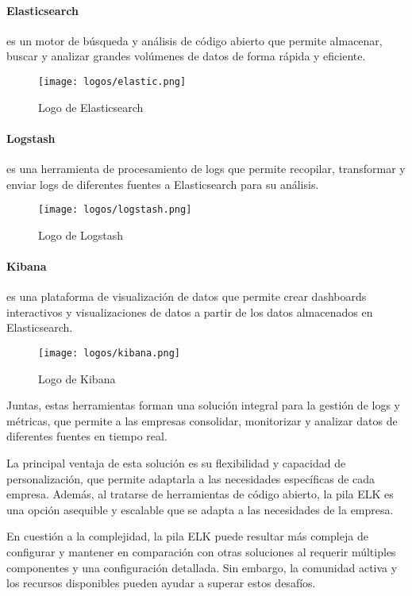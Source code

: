 \paragraph{Elasticsearch} es un motor de búsqueda y análisis de código abierto
que permite almacenar, buscar y analizar grandes volúmenes de datos de forma
rápida y eficiente.

\begin{figure}[H]
	\centering
	\texttt{[image: logos/elastic.png]}
	\caption{Logo de Elasticsearch~\textregistered}
\end{figure}

\paragraph{Logstash} es una herramienta de procesamiento de logs que permite
recopilar, transformar y enviar logs de diferentes fuentes a Elasticsearch para
su análisis.

\begin{figure}[H]
	\centering
	\texttt{[image: logos/logstash.png]}
	\caption{Logo de Logstash~\textregistered}
\end{figure}

\paragraph{Kibana} es una plataforma de visualización de datos que permite
crear dashboards interactivos y visualizaciones de datos a partir de los datos
almacenados en Elasticsearch.

\begin{figure}[H]
	\centering
	\texttt{[image: logos/kibana.png]}
	\caption{Logo de Kibana~\textregistered}
\end{figure}

Juntas, estas herramientas forman una solución integral para la
gestión de logs y métricas, que permite a las empresas consolidar, monitorizar y
analizar datos de diferentes fuentes en tiempo real.

La principal ventaja de esta solución es su flexibilidad y capacidad de
personalización, que permite adaptarla a las necesidades específicas de cada
empresa. Además, al tratarse de herramientas de código abierto, la pila ELK es
una opción asequible y escalable que se adapta a las necesidades de la empresa.

En cuestión a la complejidad, la pila ELK puede resultar más compleja de
configurar y mantener en comparación con otras soluciones al requerir múltiples
componentes y una configuración detallada. Sin embargo, la comunidad activa y
los recursos disponibles pueden ayudar a superar estos desafíos.

